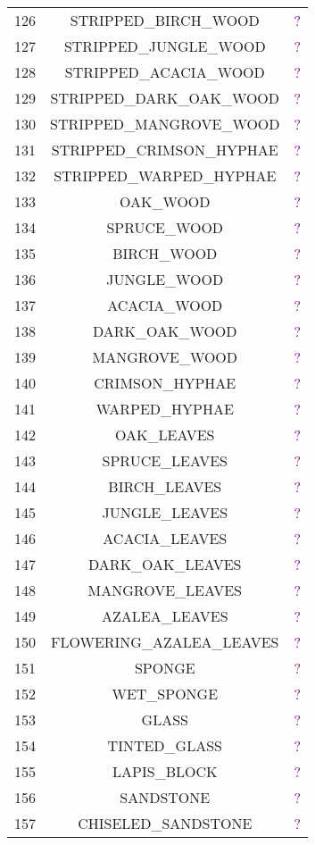 \documentclass[11pt]{article}
\newcommand\myworries[1]{\textcolor{purple}{#1}}
\begin{document}
\begin{longtable}{ |c|c|c| }
	126 & STRIPPED\_BIRCH\_WOOD & \myworries{?} \\
	127 & STRIPPED\_JUNGLE\_WOOD & \myworries{?} \\
	128 & STRIPPED\_ACACIA\_WOOD & \myworries{?} \\
	129 & STRIPPED\_DARK\_OAK\_WOOD & \myworries{?} \\
	130 & STRIPPED\_MANGROVE\_WOOD & \myworries{?} \\
	131 & STRIPPED\_CRIMSON\_HYPHAE & \myworries{?} \\
	132 & STRIPPED\_WARPED\_HYPHAE & \myworries{?} \\
	133 & OAK\_WOOD & \myworries{?} \\
	134 & SPRUCE\_WOOD & \myworries{?} \\
	135 & BIRCH\_WOOD & \myworries{?} \\
	136 & JUNGLE\_WOOD & \myworries{?} \\
	137 & ACACIA\_WOOD & \myworries{?} \\
	138 & DARK\_OAK\_WOOD & \myworries{?} \\
	139 & MANGROVE\_WOOD & \myworries{?} \\
	140 & CRIMSON\_HYPHAE & \myworries{?} \\
	141 & WARPED\_HYPHAE & \myworries{?} \\
	142 & OAK\_LEAVES & \myworries{?} \\
	143 & SPRUCE\_LEAVES & \myworries{?} \\
	144 & BIRCH\_LEAVES & \myworries{?} \\
	145 & JUNGLE\_LEAVES & \myworries{?} \\
	146 & ACACIA\_LEAVES & \myworries{?} \\
	147 & DARK\_OAK\_LEAVES & \myworries{?} \\
	148 & MANGROVE\_LEAVES & \myworries{?} \\
	149 & AZALEA\_LEAVES & \myworries{?} \\
	150 & FLOWERING\_AZALEA\_LEAVES & \myworries{?} \\
	151 & SPONGE & \myworries{?} \\
	152 & WET\_SPONGE & \myworries{?} \\
	153 & GLASS & \myworries{?} \\
	154 & TINTED\_GLASS & \myworries{?} \\
	155 & LAPIS\_BLOCK & \myworries{?} \\
	156 & SANDSTONE & \myworries{?} \\
	157 & CHISELED\_SANDSTONE & \myworries{?} \\

\end{longtable}
\end{document}
